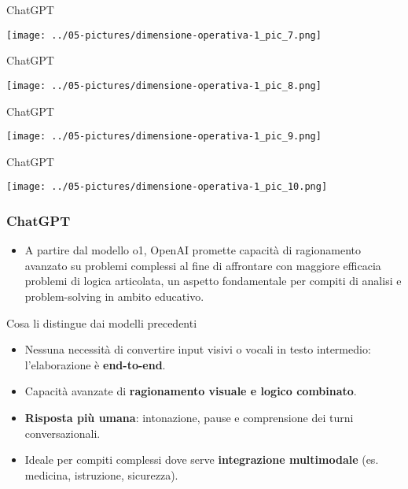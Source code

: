 \documentclass[aspectratio=169]{beamer}
\begin{document}
%
%
\begin{frame}{ChatGPT}
\begin{center}
\texttt{[image: ../05-pictures/dimensione-operativa-1\_pic\_7.png]} 
\end{center}
\end{frame}
%
%
\begin{frame}{ChatGPT}
\begin{center}
\texttt{[image: ../05-pictures/dimensione-operativa-1\_pic\_8.png]} 
\end{center}
\end{frame}
%
%
\begin{frame}{ChatGPT}
\begin{center}
\texttt{[image: ../05-pictures/dimensione-operativa-1\_pic\_9.png]} 
\end{center}
\end{frame}
%
%
\begin{frame}{ChatGPT}
\begin{center}
\texttt{[image: ../05-pictures/dimensione-operativa-1\_pic\_10.png]} 
\end{center}
\end{frame}
%
%
\begin{frame}
\frametitle{ChatGPT}
\begin{itemize}
    \item A partire dal modello o1, OpenAI promette capacità di ragionamento avanzato su problemi complessi al fine di affrontare con maggiore efficacia problemi di logica articolata, un aspetto fondamentale per compiti di analisi e problem-solving in ambito educativo.
\end{itemize}
\end{frame}
%
%
\begin{frame}{Cosa li distingue dai modelli precedenti}
  \begin{itemize}
    \item Nessuna necessità di convertire input visivi o vocali in testo intermedio: l'elaborazione è \textbf{end-to-end}.
    \item Capacità avanzate di \textbf{ragionamento visuale e logico combinato}.
    \item \textbf{Risposta più umana}: intonazione, pause e comprensione dei turni conversazionali.
    \item Ideale per compiti complessi dove serve \textbf{integrazione multimodale} (es. medicina, istruzione, sicurezza).
  \end{itemize}
\end{frame}
\end{document}
